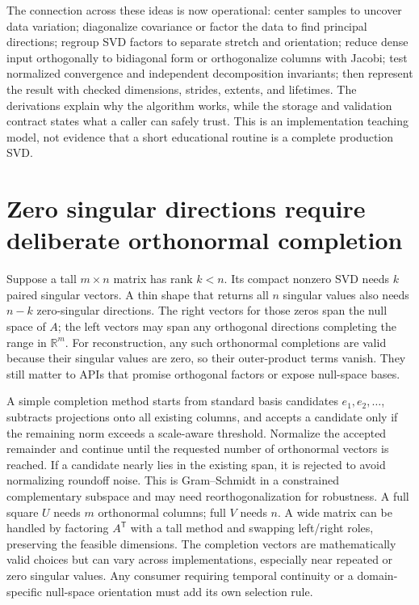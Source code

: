 The connection across these ideas is now operational: center samples to uncover data variation; diagonalize covariance or factor the data to find principal directions; regroup SVD factors to separate stretch and orientation; reduce dense input orthogonally to bidiagonal form or orthogonalize columns with Jacobi; test normalized convergence and independent decomposition invariants; then represent the result with checked dimensions, strides, extents, and lifetimes. The derivations explain why the algorithm works, while the storage and validation contract states what a caller can safely trust. This is an implementation teaching model, not evidence that a short educational routine is a complete production SVD.

\section{Zero singular directions require deliberate orthonormal completion}\label{02-foundations-ii-ch038-zero-singular-directions-require-deliberate-orthonormal-completion}

\hypertarget{02-foundations-ii-ch038-zero-singular-directions-require-deliberate-orthonormal-completion}{}

Suppose a tall \(m\times n\) matrix has rank \(k<n\). Its compact nonzero SVD needs \(k\) paired singular vectors. A thin shape that returns all \(n\) singular values also needs \(n-k\) zero-singular directions. The right vectors for those zeros span the null space of \(A\); the left vectors may span any orthogonal directions completing the range in \(\mathbb R^m\). For reconstruction, any such orthonormal completions are valid because their singular values are zero, so their outer-product terms vanish. They still matter to APIs that promise orthogonal factors or expose null-space bases.

A simple completion method starts from standard basis candidates \(e_1,e_2,\ldots\), subtracts projections onto all existing columns, and accepts a candidate only if the remaining norm exceeds a scale-aware threshold. Normalize the accepted remainder and continue until the requested number of orthonormal vectors is reached. If a candidate nearly lies in the existing span, it is rejected to avoid normalizing roundoff noise. This is Gram--Schmidt in a constrained complementary subspace and may need reorthogonalization for robustness. A full square \(U\) needs \(m\) orthonormal columns; full \(V\) needs \(n\). A wide matrix can be handled by factoring \(A^\mathsf T\) with a tall method and swapping left/right roles, preserving the feasible dimensions. The completion vectors are mathematically valid choices but can vary across implementations, especially near repeated or zero singular values. Any consumer requiring temporal continuity or a domain-specific null-space orientation must add its own selection rule.

